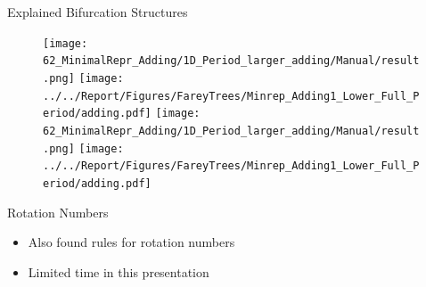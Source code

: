 \begin{frame}{Explained Bifurcation Structures}
	\begin{figure}
		\texttt{[image: 62\_MinimalRepr\_Adding/1D\_Period\_larger\_adding/Manual/result.png]}
		\texttt{[image: ../../Report/Figures/FareyTrees/Minrep\_Adding1\_Lower\_Full\_Period/adding.pdf]}
		\qquad
		\texttt{[image: 62\_MinimalRepr\_Adding/1D\_Period\_larger\_adding/Manual/result.png]}
		\texttt{[image: ../../Report/Figures/FareyTrees/Minrep\_Adding1\_Lower\_Full\_Period/adding.pdf]}
	\end{figure}
\end{frame}

\begin{frame}{Rotation Numbers}
	\begin{itemize}
		\item Also found rules for rotation numbers
		\item Limited time in this presentation
	\end{itemize}
\end{frame}



